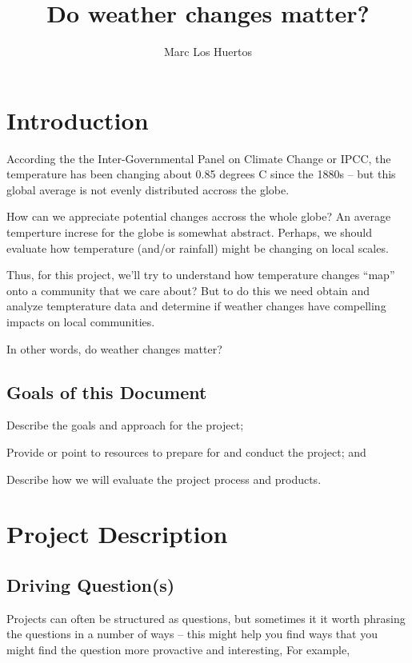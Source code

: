 \documentclass{article}\usepackage[]{graphicx}\usepackage[]{color}
\title{Do weather changes matter?}
\author{Marc Los Huertos}
\newenvironment{enumerate*}%
  {\begin{enumerate}%
    \setlength{\itemsep}{0pt}%
    \setlength{\parskip}{0pt}}%
  {\end{enumerate}}
\begin{document}
\maketitle

\section{Introduction}


According the the Inter-Governmental Panel on Climate Change or IPCC, the temperature has been changing about 0.85 degrees C since the  1880s -- but this global average is not evenly distributed accross the globe. 

How can we appreciate potential changes accross the whole globe? An average temperture increse for the globe is somewhat abstract.   Perhaps, we should evaluate how temperature (and/or rainfall) might be changing on local scales. 

Thus, for this project, we'll try to understand how temperature changes ``map'' onto a community that we care about? But to do this we need obtain and analyze tempterature data and determine if weather changes have compelling impacts on local communities.

In other words, do weather changes matter?

\subsection{Goals of this Document}

\begin{enumerate*}
  \item Describe the goals and approach for the project;
  \item Provide or point to resources to prepare for and conduct the project; and
  \item Describe how we will evaluate the project process and products.
\end{enumerate*}

\section{Project Description}

\subsection{Driving Question(s)}

Projects can often be structured as questions, but sometimes it it worth phrasing the questions in a number of ways -- this might help you find ways that you might find the question more provactive and interesting, For example,
\end{document}
